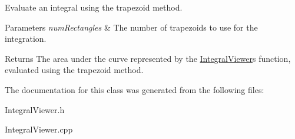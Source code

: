 Evaluate an integral using the trapezoid method. 


\begin{DoxyParams}{Parameters}
{\em num\+Rectangles} & The number of trapezoids to use for the integration. \\
\hline
\end{DoxyParams}
\begin{DoxyReturn}{Returns}
The area under the curve represented by the \hyperlink{class_integral_viewer}{Integral\+Viewer}\textquotesingle{}s function, evaluated using the trapezoid method. 
\end{DoxyReturn}


The documentation for this class was generated from the following files\+:\begin{DoxyCompactItemize}
\item 
Integral\+Viewer.\+h\item 
Integral\+Viewer.\+cpp\end{DoxyCompactItemize}
